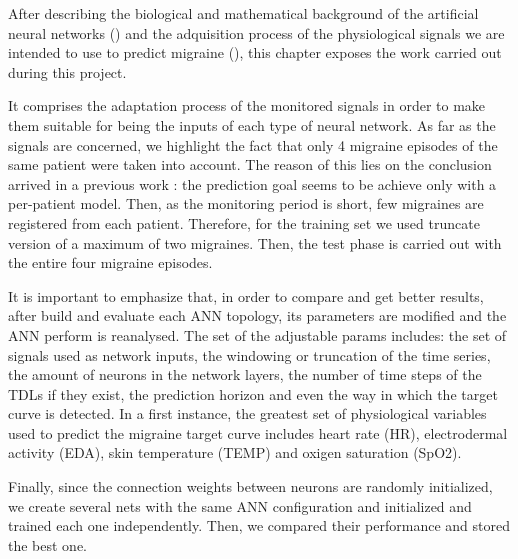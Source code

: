 \label{chapter:application}

After describing the biological and mathematical background of the artificial neural networks () and the adquisition process of the physiological signals we are intended to use to predict migraine (), this chapter exposes the work carried out during this project.


It comprises the adaptation process of the monitored signals in order to make them suitable for being the inputs of each type of neural network. 
As far as the signals are concerned, we highlight the fact that only 4 migraine episodes of the same patient were taken into account. 
The reason of this lies on the conclusion arrived in a previous work \cite{Irene:PFC:2014}: 
the prediction goal seems to be achieve only with a per-patient model. 
Then, as the monitoring period is short, few migraines are registered from each patient.
Therefore, for the training set we used truncate version of a maximum of two migraines. Then, the test phase is carried out with the entire four migraine episodes.


It is important to emphasize that,
in order to compare and get better results,
after build and evaluate each ANN topology,
its parameters are modified and the ANN perform is reanalysed. 
The set of the adjustable params includes:
the set of signals used as network inputs,
the windowing or truncation of the time series,
the amount of neurons in the network layers, 
the number of time steps of the TDLs if they exist,
the prediction horizon  
and even the way in which the target curve is detected.
In a first instance, the greatest set of physiological variables used to predict the migraine target curve includes heart rate (HR), electrodermal activity (EDA), skin temperature (TEMP) and oxigen saturation (SpO2).

Finally, since the connection weights between neurons are randomly initialized,
we create several nets with the same ANN configuration and initialized
and trained each one independently. 
Then, we compared their performance and stored the best one.
